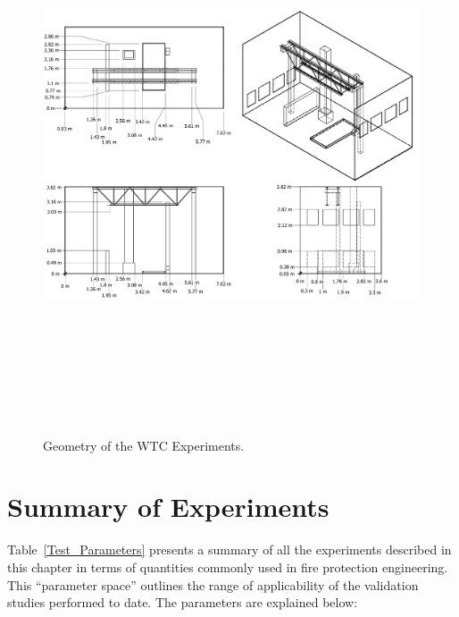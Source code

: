\begin{figure}
\begin{center}
\includegraphics[height=6.5in]{FIGURES/WTC/WTC_AutoDesk_Schematic}
\end{center}
\caption[Geometry of the WTC Experiments]{Geometry of the WTC Experiments.}
\label{WTC_Drawing}
\end{figure}


\section{Summary of Experiments}

\label{experiment_summary}

Table~\ref{Test_Parameters} presents a summary of all the experiments described in this chapter in terms of quantities commonly used in fire protection engineering. This ``parameter space''
outlines the range of applicability of the validation studies performed to date. The parameters are explained below:

